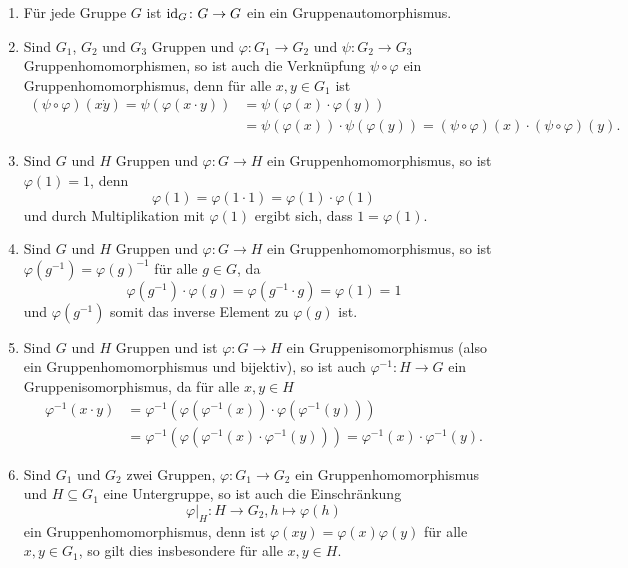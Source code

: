 \begin{bem}
 \begin{enumerate}[leftmargin=*]
  \item
   Für jede Gruppe $G$ ist $\mathrm{id}_G \colon G \to G$ ein ein Gruppenautomorphismus.
  \item
   Sind $G_1$, $G_2$ und $G_3$ Gruppen und $\varphi \colon G_1 \to G_2$ und $\psi \colon G_2 \to G_3$ Gruppenhomomorphismen, so ist auch die Verknüpfung $\psi \circ \varphi$ ein Gruppenhomomorphismus, denn für alle $x,y \in G_1$ ist
   \begin{align*}
    (\psi \circ \varphi)(x \dot y)
    = \psi(\varphi(x \cdot y))
    &= \psi(\varphi(x) \cdot \varphi(y)) \\
    &= \psi(\varphi(x)) \cdot \psi(\varphi(y))
    = (\psi \circ \varphi)(x) \cdot (\psi \circ \varphi)(y).
   \end{align*}
  \item
   Sind $G$ und $H$ Gruppen und $\varphi \colon G \to H$ ein Gruppenhomomorphismus, so ist $\varphi(1) = 1$, denn
   \[
    \varphi(1)
    = \varphi(1 \cdot 1)
    = \varphi(1) \cdot \varphi(1)
   \]
   und durch Multiplikation mit $\varphi(1)$ ergibt sich, dass $1 = \varphi(1)$.
  \item
   Sind $G$ und $H$ Gruppen und $\varphi \colon G \to H$ ein Gruppenhomomorphismus, so ist $\varphi(g^{-1}) = \varphi(g)^{-1}$ für alle $g \in G$, da
   \[
    \varphi(g^{-1}) \cdot \varphi(g)
    = \varphi(g^{-1} \cdot g)
    = \varphi(1)
    = 1
   \]
   und $\varphi(g^{-1})$ somit das inverse Element zu $\varphi(g)$ ist.
  \item
   Sind $G$ und $H$ Gruppen und ist $\varphi \colon G \to H$ ein Gruppenisomorphismus (also ein Gruppenhomomorphismus und bijektiv), so ist auch $\varphi^{-1} \colon H \to G$ ein Gruppenisomorphismus, da für alle $x,y \in H$
   \begin{align*}
    \varphi^{-1}(x \cdot y)
    &= \varphi^{-1}( \varphi(\varphi^{-1}(x)) \cdot \varphi(\varphi^{-1}(y)) ) \\
    &= \varphi^{-1}( \varphi( \varphi^{-1}(x) \cdot \varphi^{-1}(y) ) )
    = \varphi^{-1}(x) \cdot \varphi^{-1}(y).
   \end{align*}
  \item
   Sind $G_1$ und $G_2$ zwei Gruppen, $\varphi \colon G_1 \to G_2$ ein Gruppenhomomorphismus und $H \subseteq G_1$ eine Untergruppe, so ist auch die Einschränkung
   \[
    \varphi|_{H} \colon H \to G_2, h \mapsto \varphi(h)
   \]
   ein Gruppenhomomorphismus, denn ist $\varphi(xy) = \varphi(x)\varphi(y)$ für alle $x,y \in G_1$, so gilt dies insbesondere für alle $x,y \in H$.
 \end{enumerate}
\end{bem}





